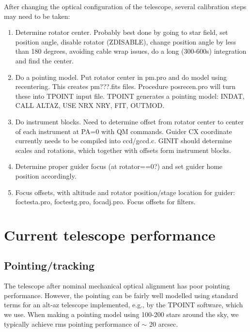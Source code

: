 \documentclass{article}[12pt]
\begin{document}
After changing the optical configuration of the telescope, several calibration
steps may need to be taken:
\begin{enumerate}

 \item Determine rotator center. Probably best done by going to star field,
set position angle, disable rotator (ZDISABLE), change position angle by
less than 180 degrees, avoiding cable wrap issues, do a long (300-600s) 
integration and find the center.

 \item Do a pointing model. Put rotator center in pm.pro and do model using
recentering.  This creates pm???.fits files. Procedure posrecen.pro will
turn these into TPOINT input file. TPOINT generates a pointing model:
INDAT, CALL ALTAZ, USE NRX NRY, FIT, OUTMOD.

 \item Do instrument blocks. Need to determine offset from rotator center
to center of each instrument at PA=0 with QM commands. Guider CX coordinate
currently needs to be compiled into ccd/gccd.c.  GINIT should determine
scales and rotations, which together with offsets form instrument blocks.

 \item Determine proper guider focus (at rotator==0?) and set guider
home position accordingly.

 \item  Focus offsets, with altitude and rotator position/stage location 
for guider: foctesta.pro, foctestg.pro, focadj.pro. Focus offsets for filters.

\end{enumerate}

\section{Current telescope performance}

\subsection{Pointing/tracking}

The telescope after nominal mechanical optical alignment has poor
pointing performance. However, the pointing can be fairly well modelled
using standard terms for an alt-az telescope implemented, e.g., by the
TPOINT software, which we use. When making a pointing model using 100-200
stars around the sky, we typically achieve rms pointing performance 
of $\sim$ 20 arcsec.
\end{document}
